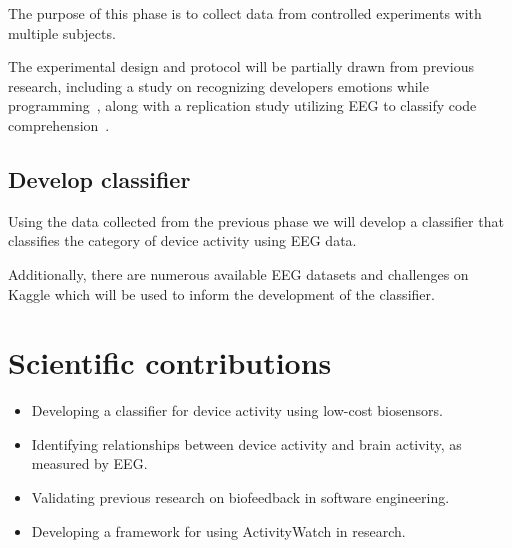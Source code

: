 \documentclass{IEEEtran}
\begin{document}
\begin{refsection}
The purpose of this phase is to collect data from controlled experiments with multiple subjects.

The experimental design and protocol will be partially drawn from previous research, including a study on recognizing developers emotions while programming~\cite{girardi_recognizing_2020}, along with a replication study utilizing EEG to classify code comprehension~\cite{fucci_replication_2019}.

\subsection{Develop classifier}

Using the data collected from the previous phase we will develop a classifier that classifies the category of device activity using EEG data.

Additionally, there are numerous available EEG datasets and challenges on Kaggle which will be used to inform the development of the classifier.




%




\section{Scientific contributions}

\begin{itemize}
  \item Developing a classifier for device activity using low-cost biosensors.
  \item Identifying relationships between device activity and brain activity, as measured by EEG\@.
  \item Validating previous research on biofeedback in software engineering.
  \item Developing a framework for using ActivityWatch in research.
\end{itemize}



\end{refsection}
\end{document}
